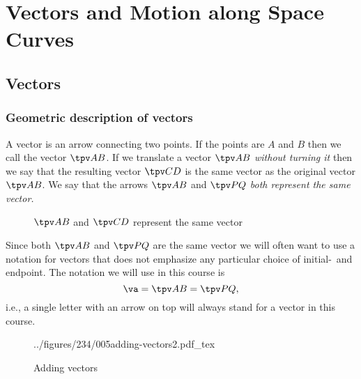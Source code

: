 \chapter{Vectors and Motion along Space Curves}

\section{Vectors} %

\subsection{Geometric description of vectors} %
\label{sec:geometric-description-of-vectors}
A vector is an arrow connecting two points.  If the points are $A$ and
$B$ then we call the vector $\tpv AB$. If we translate a vector $\tpv
AB$ \emph{without turning it} then we say that the resulting vector
$\tpv CD$ is the same vector as the original vector $\tpv AB$.  We say
that the arrows $\tpv AB$ and $\tpv PQ$ \emph{both represent the same
  vector.}
\begin{figure}[h]\centering
  
  \caption{$\tpv AB$ and $\tpv CD$ represent the same vector}
\end{figure}
Since both $\tpv AB$ and $\tpv PQ$ are the same vector we will often
want to use a notation for vectors that does not emphasize any
particular choice of initial-~and endpoint.  The notation we will use
in this course is
\[
\va = \tpv AB = \tpv PQ,
\]
i.e., a single letter with an arrow on top will always stand for a
vector in this course.

\begin{figure}[h]\centering
  \def\figfont{\sffamily\footnotesize\color{darkbluegreen}\centering}
  \def\addingvectorsCapA{\parbox{1in}{\figfont%
      to add\\
      two vectors\dots}} \def\addingvectorsCapB{\parbox{1in}{\figfont%
      \dots move one vector until its initial point\dots}}
  \def\addingvectorsCapC{\parbox{1in}{\figfont%
      \dots is the end point of the other\dots} }
  \def\addingvectorsCapD{\parbox{1in}{\figfont%
      \dots and combine them.} } 
  ../figures/234/005adding-vectors2.pdf_tex
  \caption{Adding vectors}
\end{figure}

